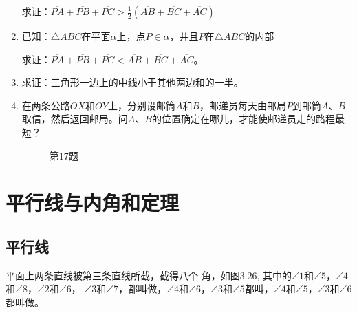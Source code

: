\begin{enumerate}
求证：$\overline{PA}+\overline{PB}+\overline{PC}>\frac{1}{2}(\overline{AB}+\overline{BC}+\overline{AC})$
\item 已知：$\triangle ABC$在平面$\alpha$上，点$P\in\alpha$，并且$P$在$\triangle ABC$的内部

求证：$\overline{PA}+\overline{PB}+\overline{PC}<\overline{AB}+\overline{BC}+\overline{AC}$。
\item 求证：三角形一边上的中线小于其他两边和的一半。
\item 在两条公路$OX$和$OY$上，分别设邮筒$A$和$B$，邮递员每天由邮局$P$到邮筒$A$、$B$取信，然后返回邮局。问$A$、$B$的位置确定在哪儿，才能使邮递员走的路程最短？

\begin{figure}[htbp]
    \centering
\begin{tikzpicture}
\end{tikzpicture}
    \caption*{第17题}
\end{figure}
\end{enumerate}

\section{平行线与内角和定理}

\subsection{平行线}
\begin{Definition}
平面上两条直线被第三条直线所截，截得八个
角，如图3.26, 其中的$\angle 1$和$\angle 5$，$\angle 4$和$\angle 8$，$\angle 2$和$\angle 6$，
$\angle 3$和$\angle 7$，都叫做，$\angle 4$和$\angle 6$，$\angle 3$和$\angle 5$都叫，$\angle 4$和$\angle 5$，$\angle 3$和$\angle 6$都叫做。
\end{Definition}

